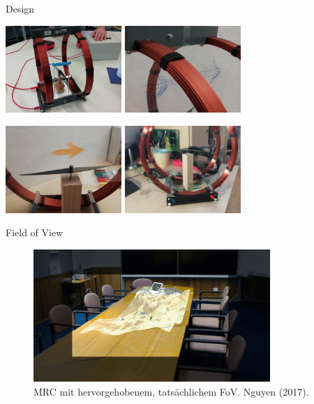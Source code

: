\begin{frame}[fragile]{Design}
\vspace{-1em}
\begin{center}
	\includegraphics[width=0.33\textwidth]{images/Design_1.jpg}
	\hspace{0.05cm}
	\includegraphics[width=0.33\textwidth]{images/Design_2.jpg}	
	
	
	\includegraphics[width=0.33\textwidth]{images/Design_3.jpg}	
	\hspace{0.05cm}
	\includegraphics[width=0.33\textwidth]{images/Design_4.jpg}	
\end{center}
\end{frame}

\begin{frame}[fragile]{Field of View}
\begin{figure}
	\includegraphics[width=0.8\textwidth]{images/papers/fov.jpg}\\
	\vspace{0.3cm}
	\scriptsize MRC mit hervorgehobenem, tatsächlichem FoV. Nguyen (2017).
\end{figure}
\end{frame}

